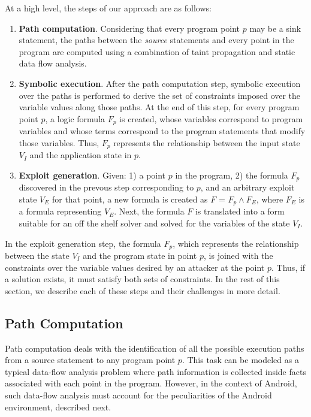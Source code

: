 At a high level, the steps of our approach are as follows:
\begin{enumerate}
	\item \textbf{Path computation}. Considering that every program point $p$ may be a sink statement, the paths between the \textit{source} statements and every point in the program are computed using a combination of taint propagation and static data flow analysis. 
	\item \textbf{Symbolic execution}. After the path computation step, symbolic execution over the paths is performed to derive the set of constraints imposed over the variable values along those paths. At the end of this step, for every program point $p$, a logic formula $F_p$ is created, whose variables correspond to program variables and whose terms correspond to the program statements that modify those variables. Thus, $F_p$ represents the relationship between the input state $V_I$ and the application state in $p$.
	\item \textbf{Exploit generation}. Given: 1) a point $p$ in the program, 2) the formula $F_p$ discovered in the prevous step corresponding to $p$, and an arbitrary exploit state $V_E$ for that point, a new formula is created as $F$ = $F_p \wedge F_E$, where $F_E$ is a formula representing $V_E$. Next, the formula $F$ is translated into a form suitable for an off the shelf solver and solved for the variables of the state $V_I$. 
\end{enumerate}

In the exploit generation step, the formula $F_p$, which represents the relationship between the state $V_I$ and the program state in point $p$, is joined with the constraints over the variable values desired by an attacker at the point $p$. Thus, if a solution exists, it must satisfy both sets of constraints. In the rest of this section, we describe each of these steps and their challenges in more detail. 

\subsection{Path Computation}
Path computation deals with the identification of all the possible execution paths from a source statement to any program point $p$.  This task can be modeled as a typical data-flow analysis problem where path information is collected inside facts associated with each point in the program. However, in the context of Android, such data-flow analysis must account for the peculiarities of the Android environment, described next.


